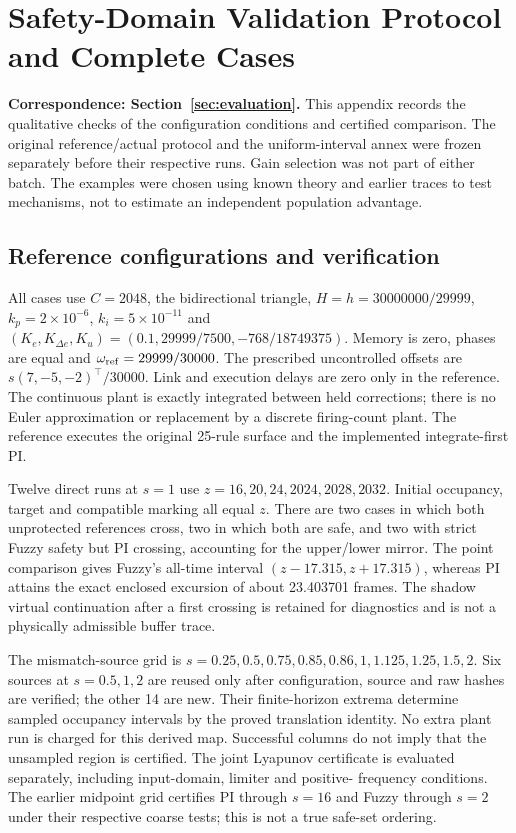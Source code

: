\section{Safety-Domain Validation Protocol and Complete Cases}
\label{app:safety_validation}
\noindent\textbf{Correspondence: Section~\ref{sec:evaluation}.}
This appendix records the qualitative checks of the configuration
conditions and certified comparison. The original reference/actual
protocol and the uniform-interval annex were frozen separately before
their respective runs. Gain selection was not part of either batch.
The examples were chosen using known theory and earlier traces to
test mechanisms, not to estimate an independent population advantage.

\subsection{Reference configurations and verification}
All cases use $C=2048$, the bidirectional triangle,
$H=h=30000000/29999$, $k_p=2\times10^{-6}$,
$k_i=5\times10^{-11}$ and
$(K_e,K_{\Delta e},K_u)=(0.1,29999/7500,-768/18749375)$.
Memory is zero, phases are equal and $\omega_{\rm ref}=29999/30000$.
The prescribed uncontrolled offsets are
$s(7,-5,-2)^\top/30000$. Link and execution delays are zero only in
the reference. The continuous plant is exactly integrated between
held corrections; there is no Euler approximation or replacement by
a discrete firing-count plant. The reference executes the original
25-rule surface and the implemented integrate-first PI.

Twelve direct runs at $s=1$ use $z=16,20,24,2024,2028,2032$.
Initial occupancy, target and compatible marking all equal $z$.
There are two cases in which both unprotected references cross,
two in which both are safe, and two with strict Fuzzy safety but
PI crossing, accounting for the upper/lower mirror.
The point comparison gives Fuzzy's all-time interval
$(z-17.315,z+17.315)$, whereas PI attains the exact enclosed
excursion of about 23.403701 frames. The shadow virtual continuation
after a first crossing is retained for diagnostics and is not a
physically admissible buffer trace.

The mismatch-source grid is
$s=0.25,\allowbreak0.5,\allowbreak0.75,\allowbreak0.85,\allowbreak0.86,\allowbreak1,\allowbreak1.125,\allowbreak1.25,\allowbreak1.5,\allowbreak2$.
Six sources at $s=0.5,1,2$ are reused only after configuration,
source and raw hashes are verified; the other 14 are new.
Their finite-horizon extrema determine sampled occupancy intervals
by the proved translation identity. No extra plant run is charged
for this derived map. Successful columns do not imply that the
unsampled region is certified. The joint Lyapunov certificate is
evaluated separately, including input-domain, limiter and positive-
frequency conditions. The earlier midpoint grid certifies PI through
$s=16$ and Fuzzy through $s=2$ under their respective coarse tests;
this is not a true safe-set ordering.

